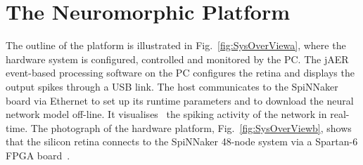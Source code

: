 \section{The Neuromorphic Platform}
\label{sec:np}
The outline of the platform is illustrated in Fig.~\ref{fig:SysOverViewa}, where the hardware system is configured, controlled and monitored by the PC.
The jAER~\cite{delbruck2008frame} event-based processing software on the PC configures the retina and displays the output spikes through a USB link.
The host communicates to the SpiNNaker board via Ethernet to set up its runtime parameters and to download the neural network model off-line.
It visualises~\cite{6252490} the spiking activity of the network in real-time.
The photograph of the hardware platform, Fig.~\ref{fig:SysOverViewb}, shows that the silicon retina connects to the SpiNNaker 48-node system via a Spartan-6 FPGA board~\cite{galluppi2012real}.


